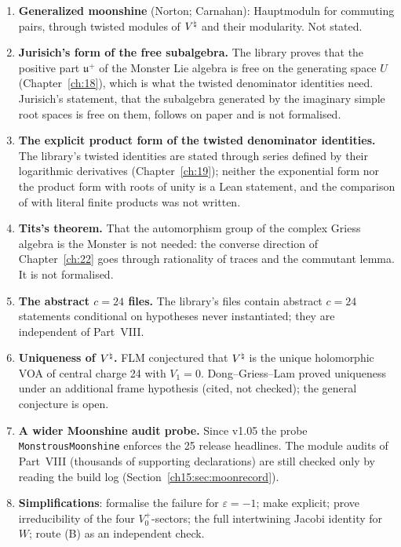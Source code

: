 \begin{enumerate}
  Norton's table (a group between $\Gamma_0(N)$ and its normaliser), to relate $N$ to the order of $g$ ($N=o(g)\,h$ with
  $h\mid\gcd(24,o(g))$), and to state anything about conjugacy classes, the character table or integrality of the
  coefficients (rationality is proved, ). Chapter~\ref{ch:16}, Section~\ref{ch16:sec:roadmap}, lists
  what is not formalised.
\item \textbf{Generalized moonshine} (Norton; Carnahan): Hauptmoduln for commuting pairs, through twisted modules of
  ${V^{\natural}}$ and their modularity. Not stated.
\item \textbf{Jurisich's form of the free subalgebra.} The library proves that the positive part $\mathfrak u^+$ of the
  Monster Lie algebra is free on the generating space $U$ (Chapter~\ref{ch:18}), which is what the twisted denominator
  identities need. Jurisich's statement, that the subalgebra generated by the imaginary simple root spaces is free on
  them, follows on paper and is not formalised.
\item \textbf{The explicit product form of the twisted denominator identities.} The library's twisted identities are
  stated through series defined by their logarithmic derivatives (Chapter~\ref{ch:19}); neither the exponential form nor
  the product form with roots of unity is a Lean statement, and the comparison of  with literal finite
  products was not written.
\item \textbf{Tits's theorem.} That the automorphism group of the complex Griess algebra is the Monster is not
  needed: the converse direction of Chapter~\ref{ch:22} goes through rationality of traces and the commutant lemma. It is
  not formalised.
\item \textbf{The abstract $c=24$ files.} The library's  files contain abstract $c=24$
  statements conditional on hypotheses never instantiated; they are independent of Part~VIII.
\item \textbf{Uniqueness of ${V^{\natural}}$.} FLM conjectured that ${V^{\natural}}$ is the unique holomorphic VOA of
  central charge 24 with $V_1=0$. Dong--Griess--Lam proved uniqueness under an additional frame
  hypothesis (cited, not checked); the general conjecture is open.
\item \textbf{A wider Moonshine audit probe.} Since v1.05 the probe \texttt{MonstrousMoonshine} enforces the 25
  release headlines. The module audits of Part~VIII (thousands of supporting declarations) are still checked only by
  reading the build log (Section~\ref{ch15:sec:moonrecord}).
\item \textbf{Simplifications}: formalise the failure for $\varepsilon=-1$; make  explicit;
  prove irreducibility of the four $V_0^+$-sectors; the full intertwining Jacobi identity for $W$;
  route (B) as an independent check.
\end{enumerate}

